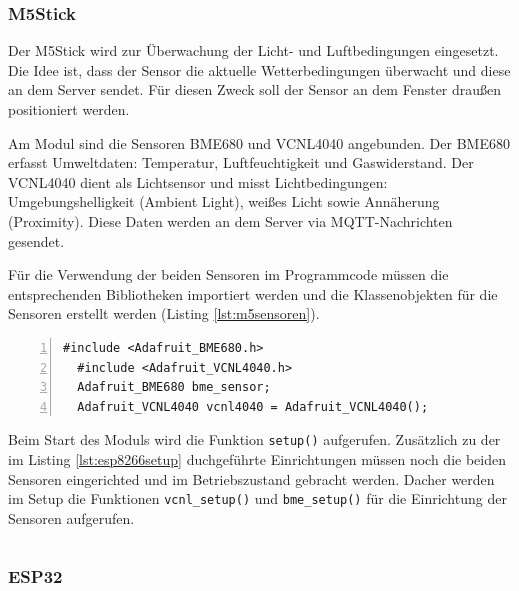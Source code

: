 \documentclass[12pt, letterpaper]{article}
\begin{document}
  
  \subsubsection{M5Stick}
  \par Der M5Stick wird zur Überwachung der Licht- und Luftbedingungen eingesetzt. Die Idee ist, dass der Sensor die aktuelle Wetterbedingungen überwacht und diese an dem Server sendet. Für diesen Zweck soll der Sensor an dem Fenster draußen positioniert werden.
  \par Am Modul sind die Sensoren BME680 und VCNL4040 angebunden. Der BME680 erfasst Umweltdaten: Temperatur, Luftfeuchtigkeit und Gaswiderstand. Der VCNL4040 dient als Lichtsensor und misst Lichtbedingungen: Umgebungshelligkeit (Ambient Light), weißes Licht sowie Annäherung (Proximity). Diese Daten werden an dem Server via MQTT-Nachrichten gesendet.
  \par Für die Verwendung der beiden Sensoren im Programmcode müssen die entsprechenden Bibliotheken importiert werden und die Klassenobjekten für die Sensoren erstellt werden (Listing \ref{lst:m5sensoren}). 
\begin{lstlisting}[frame=single, style=cpp, numbers=left, label={lst:m5sensoren}, caption={M5Stick: Sensoren}]
  #include <Adafruit_BME680.h>
  #include <Adafruit_VCNL4040.h>
  Adafruit_BME680 bme_sensor;
  Adafruit_VCNL4040 vcnl4040 = Adafruit_VCNL4040();
\end{lstlisting}

\par Beim Start des Moduls wird die Funktion \texttt{setup()} aufgerufen. Zusätzlich zu der im Listing \ref{lst:esp8266setup} duchgeführte Einrichtungen müssen noch die beiden Sensoren eingerichted und im Betriebszustand gebracht werden. Dacher werden im Setup die Funktionen \texttt{vcnl\_setup()} und \texttt{bme\_setup()} für die Einrichtung der Sensoren aufgerufen.

\begin{lstlisting}[frame=single, style=cpp, numbers=left, label={lst:m5vcnlsetup}, caption={M5Stick: vcnl\_setup}]

\end{lstlisting}

\subsubsection{ESP32}
\newpage
\end{document}
